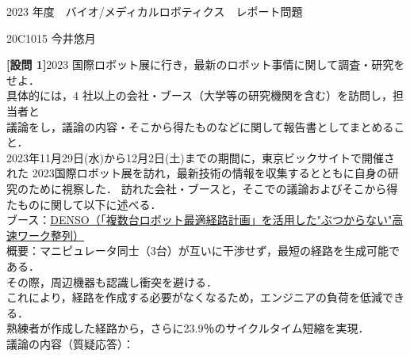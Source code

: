 \documentclass{jsarticle}
\begin{document}
\vspace*{-20mm}
{\LARGE 2023 年度　バイオ/メディカルロボティクス　レポート問題}
\begin{flushright}
\large 20C1015 今井悠月
\end{flushright}
\vspace*{10mm}

\textbf{{[設問 1]}}\hspace*{1zw}2023 国際ロボット展に行き，最新のロボット事情に関して調査・研究をせよ．\\
\hspace*{5.7zw}具体的には，4 社以上の会社・ブース（大学等の研究機関を含む）を訪問し，担当者と\\
\hspace*{5.7zw}議論をし，議論の内容・そこから得たものなどに関して報告書としてまとめること．\\

\hspace*{5.7zw}2023年11月29日(水)から12月2日(土)までの期間に，東京ビックサイトで開催された
\hspace*{5.7zw}2023国際ロボット展を訪れ，最新技術の情報を収集するとともに自身の研究のために視察した．
\hspace*{5.7zw}訪れた会社・ブースと，そこでの議論およびそこから得たものに関して以下に述べる．\\

\vspace*{4mm}
\hspace*{4.7zw}ブース：\underline{DENSO（「複数台ロボット最適経路計画」を活用した"ぶつからない"高速ワーク整列）}\\

\hspace*{4.7zw}概要：マニピュレータ同士（3台）が互いに干渉せず，最短の経路を生成可能である．\\
\hspace*{8.7zw}その際，周辺機器も認識し衝突を避ける．\\
\hspace*{8.7zw}これにより，経路を作成する必要がなくなるため，エンジニアの負荷を低減できる．\\
\hspace*{8.7zw}熟練者が作成した経路から，さらに23.9％のサイクルタイム短縮を実現．\\


\hspace*{4.7zw}議論の内容（質疑応答）：
\end{document}

